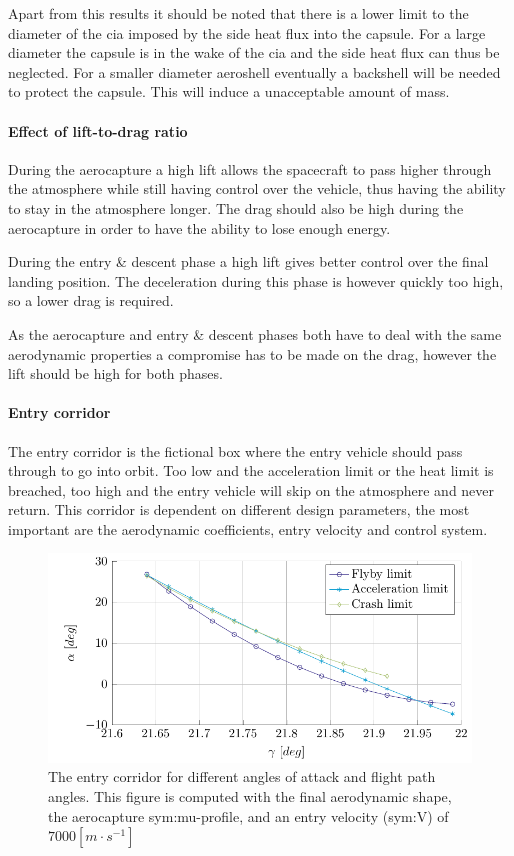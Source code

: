 Apart from this results it should be noted that there is a lower limit to the diameter of the \gls{cia} imposed by the side heat flux into the capsule. For a large diameter the capsule is in the wake of the \gls{cia} and the side heat flux can thus be neglected. For a smaller diameter aeroshell eventually a backshell will be needed to protect the capsule. This will induce a unacceptable amount of mass.

\paragraph{Effect of lift-to-drag ratio}
During the aerocapture a high lift allows the spacecraft to pass higher through the atmosphere while still having control over the vehicle, thus having the ability to stay in the atmosphere longer. The drag should also be high during the aerocapture in order to have the ability to lose enough energy.

During the entry \& descent phase a high lift gives better control over the final landing position. The deceleration during this phase is however quickly too high, so a lower drag is required.

As the aerocapture and entry \& descent phases both have to deal with the same aerodynamic properties a compromise has to be made on the drag, however the lift should be high for both phases.

\paragraph{Entry corridor}
The entry corridor is the fictional box where the entry vehicle should pass through to go into orbit. Too low and the acceleration limit or the heat limit is breached, too high and the entry vehicle will skip on the atmosphere and never return. This corridor is dependent on different design parameters, the most important are the aerodynamic coefficients, entry velocity and control system.

\begin{figure}[h]
	\centering
	\includegraphics[width=\textwidth]{./Figure/orbit/alpha_gamma.pdf}
	\caption[The entry corridor for different angles of attack and flight path angles]{The entry corridor for different angles of attack and flight path angles. This figure is computed with the final aerodynamic shape, the aerocapture \gls{sym:mu}-profile, and an entry velocity (\gls{sym:V}) of $7000 \left[m\cdot s^{-1}\right]$}
	\label{fig:alpha_gamma}
\end{figure}

